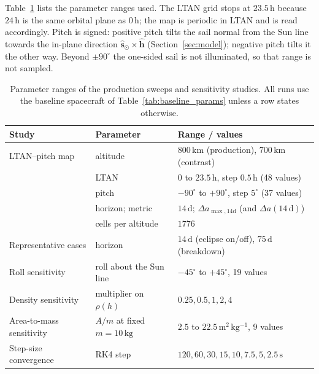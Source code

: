 \vspace{5pt}
\par\noindent Table~\ref{tab:sweep_params} lists the parameter ranges used. The LTAN grid stops at \(23.5\,\mathrm{h}\) because \(24\,\mathrm{h}\) is the same orbital plane as \(0\,\mathrm{h}\); the map is periodic in LTAN and is read accordingly. Pitch is signed: positive pitch tilts the sail normal from the Sun line towards the in-plane direction \(\hat{\mathbf{s}}_{\odot}\times\hat{\mathbf{h}}\) (Section~\ref{sec:model}); negative pitch tilts it the other way. Beyond \(\pm90^\circ\) the one-sided sail is not illuminated, so that range is not sampled.

\begin{table}[htbp]
\centering
\caption{Parameter ranges of the production sweeps and sensitivity studies. All runs use the baseline spacecraft of Table~\ref{tab:baseline_params} unless a row states otherwise.}
\label{tab:sweep_params}
\vspace{0.5em}
\small
\begin{tabular}{p{3.3cm} p{3.4cm} p{5.6cm}}
\hline
\textbf{Study} & \textbf{Parameter} & \textbf{Range / values} \\
\hline
LTAN--pitch map & altitude & \(800\,\mathrm{km}\) (production), \(700\,\mathrm{km}\) (contrast) \\
 & LTAN & \(0\) to \(23.5\,\mathrm{h}\), step \(0.5\,\mathrm{h}\) (48 values) \\
 & pitch & \(-90^\circ\) to \(+90^\circ\), step \(5^\circ\) (37 values) \\
 & horizon; metric & \(14\,\mathrm{d}\); \(\Delta a_{\max,14\mathrm{d}}\) (and \(\Delta a(14\,\mathrm{d})\)) \\
 & cells per altitude & \(1776\) \\
Representative cases & horizon & \(14\,\mathrm{d}\) (eclipse on/off), \(75\,\mathrm{d}\) (breakdown) \\
Roll sensitivity & roll about the Sun line & \(-45^\circ\) to \(+45^\circ\), 19 values \\
Density sensitivity & multiplier on \(\rho(h)\) & \(0.25, 0.5, 1, 2, 4\) \\
Area-to-mass sensitivity & \(A/m\) at fixed \(m = 10\,\mathrm{kg}\) & \(2.5\) to \(22.5\,\mathrm{m^2\,kg^{-1}}\), 9 values \\
Step-size convergence & RK4 step & \(120, 60, 30, 15, 10, 7.5, 5, 2.5\,\mathrm{s}\) \\
\hline
\end{tabular}
\end{table}

